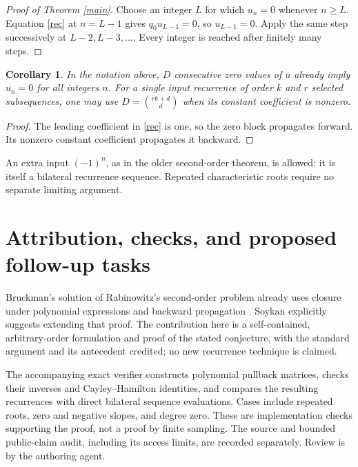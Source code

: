 \documentclass[11pt]{article}
\newtheorem{corollary}{Corollary}
\begin{document}
\begin{proof}[Proof of Theorem \ref{main}]
Choose an integer $L$ for which $u_n=0$ whenever $n\geq L$.
Equation \eqref{rec} at $n=L-1$ gives $q_0u_{L-1}=0$,
so $u_{L-1}=0$. Apply the same step successively at
$L-2,L-3,\ldots$. Every integer is reached after finitely many steps.
\end{proof}

\begin{corollary}
In the notation above, $D$ consecutive zero values of $u$ already imply
$u_n=0$ for all integers $n$. For a single input recurrence of order $k$
and $r$ selected subsequences, one may use $D=\binom{rk+d}{d}$ when
its constant coefficient is nonzero.
\end{corollary}
\begin{proof}
The leading coefficient in \eqref{rec} is one, so the zero block
propagates forward. Its nonzero constant coefficient propagates it backward.
\end{proof}
An extra input $(-1)^n$, as in the older second-order theorem, is allowed:
it is itself a bilateral recurrence sequence. Repeated characteristic
roots require no separate limiting argument.

\section*{Attribution, checks, and proposed follow-up tasks}
Bruckman's solution of Rabinowitz's second-order problem already uses
closure under polynomial expressions and backward propagation
\cite{Bruckman}. Soykan explicitly suggests extending that proof.
The contribution here is a self-contained, arbitrary-order formulation
and proof of the stated conjecture, with the standard argument and its
antecedent credited; no new recurrence technique is claimed.

The accompanying exact verifier constructs polynomial pullback matrices,
checks their inverses and Cayley--Hamilton identities, and compares the
resulting recurrences with direct bilateral sequence evaluations. Cases
include repeated roots, zero and negative slopes, and degree zero.
These are implementation checks supporting the proof, not a proof by
finite sampling. The source and bounded public-claim audit, including its
access limits, are recorded separately. Review is by the authoring agent.
\end{document}
